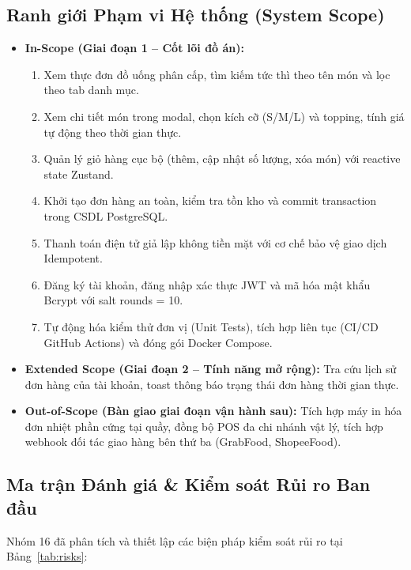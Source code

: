 \documentclass[a4paper]{article}
\begin{document}
\subsection{Ranh giới Phạm vi Hệ thống (System Scope)}
\begin{itemize}
    \item \textbf{In-Scope (Giai đoạn 1 -- Cốt lõi đồ án):}
    \begin{enumerate}
        \item Xem thực đơn đồ uống phân cấp, tìm kiếm tức thì theo tên món và lọc theo tab danh mục.
        \item Xem chi tiết món trong modal, chọn kích cỡ (S/M/L) và topping, tính giá tự động theo thời gian thực.
        \item Quản lý giỏ hàng cục bộ (thêm, cập nhật số lượng, xóa món) với reactive state Zustand.
        \item Khởi tạo đơn hàng an toàn, kiểm tra tồn kho và commit transaction trong CSDL PostgreSQL.
        \item Thanh toán điện tử giả lập không tiền mặt với cơ chế bảo vệ giao dịch Idempotent.
        \item Đăng ký tài khoản, đăng nhập xác thực JWT và mã hóa mật khẩu Bcrypt với salt rounds = 10.
        \item Tự động hóa kiểm thử đơn vị (Unit Tests), tích hợp liên tục (CI/CD GitHub Actions) và đóng gói Docker Compose.
    \end{enumerate}
    \item \textbf{Extended Scope (Giai đoạn 2 -- Tính năng mở rộng):} Tra cứu lịch sử đơn hàng của tài khoản, toast thông báo trạng thái đơn hàng thời gian thực.
    \item \textbf{Out-of-Scope (Bàn giao giai đoạn vận hành sau):} Tích hợp máy in hóa đơn nhiệt phần cứng tại quầy, đồng bộ POS đa chi nhánh vật lý, tích hợp webhook đối tác giao hàng bên thứ ba (GrabFood, ShopeeFood).
\end{itemize}

\subsection{Ma trận Đánh giá \& Kiểm soát Rủi ro Ban đầu}
Nhóm 16 đã phân tích và thiết lập các biện pháp kiểm soát rủi ro tại Bảng~\ref{tab:risks}:
\end{document}

